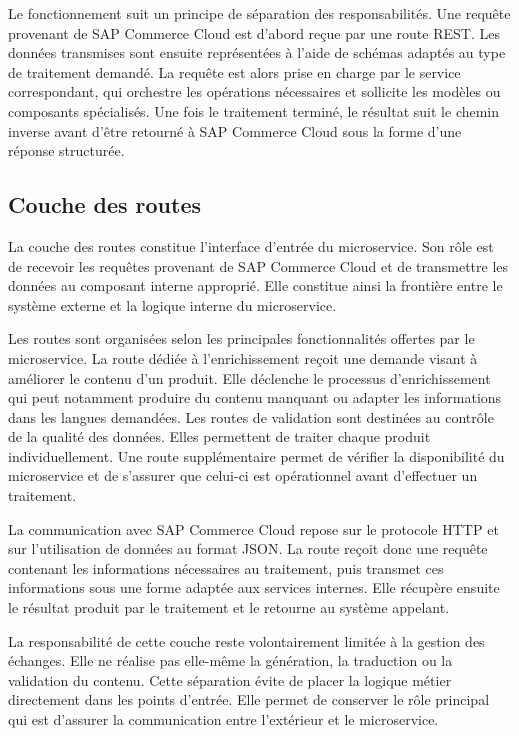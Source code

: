Le fonctionnement suit un principe de séparation des responsabilités. Une requête provenant de SAP Commerce Cloud est d'abord reçue par une route REST. Les données transmises sont ensuite représentées à l'aide de schémas adaptés au type de traitement demandé. La requête est alors prise en charge par le service correspondant, qui orchestre les opérations nécessaires et sollicite les modèles ou composants spécialisés. Une fois le traitement terminé, le résultat suit le chemin inverse avant d'être retourné à SAP Commerce Cloud sous la forme d'une réponse structurée.

\subsection{Couche des routes}

La couche des routes constitue l'interface d'entrée du microservice. Son rôle est de recevoir les requêtes provenant de SAP Commerce Cloud et de transmettre les données au composant interne approprié. Elle constitue ainsi la frontière entre le système externe et la logique interne du microservice.

Les routes sont organisées selon les principales fonctionnalités offertes par le microservice. La route dédiée à l'enrichissement reçoit une demande visant à améliorer le contenu d'un produit. Elle déclenche le processus d'enrichissement qui peut notamment produire du contenu manquant ou adapter les informations dans les langues demandées. Les routes de validation sont destinées au contrôle de la qualité des données. Elles permettent de traiter chaque produit individuellement. Une route supplémentaire permet de vérifier la disponibilité du microservice et de s'assurer que celui-ci est opérationnel avant d'effectuer un traitement.

La communication avec SAP Commerce Cloud repose sur le protocole HTTP et sur l'utilisation de données au format JSON. La route reçoit donc une requête contenant les informations nécessaires au traitement, puis transmet ces informations sous une forme adaptée aux services internes. Elle récupère ensuite le résultat produit par le traitement et le retourne au système appelant.

La responsabilité de cette couche reste volontairement limitée à la gestion des échanges. Elle ne réalise pas elle-même la génération, la traduction ou la validation du contenu. Cette séparation évite de placer la logique métier directement dans les points d'entrée. Elle permet de conserver le rôle principal qui est d'assurer la communication entre l'extérieur et le microservice.

